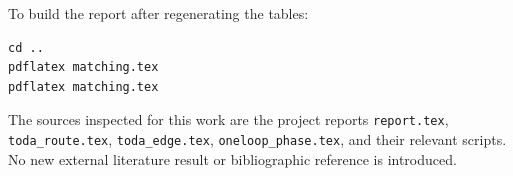 \documentclass[11pt,a4paper]{article}
\begin{document}
To build the report after regenerating the tables:
\begin{verbatim}
cd ..
pdflatex matching.tex
pdflatex matching.tex
\end{verbatim}

The sources inspected for this work are the project reports
\texttt{report.tex}, \texttt{toda\_route.tex}, \texttt{toda\_edge.tex},
\texttt{oneloop\_phase.tex}, and their relevant scripts. No new external
literature result or bibliographic reference is introduced.
\end{document}
